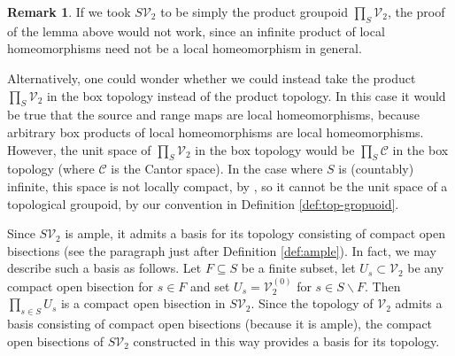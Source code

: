\documentclass[10pt,a4paper]{amsart}
\numberwithin{equation}{section}
\numberwithin{figure}{section}
\theoremstyle{definition}
\newtheorem{rem}[thm]{Remark}
\newcommand{\cC}{\mathcal{C}}
\newcommand{\cV}{\mathcal{V}}
\begin{document}
\begin{rem}
If we took $S\cV_2$ to be simply the product groupoid $\prod_S \cV_2$, the proof of the lemma above would not work, since an infinite product of local homeomorphisms need not be a local homeomorphism in general.

Alternatively, one could wonder whether we could instead take the product $\prod_S \cV_2$ in the box topology instead of the product topology. In this case it would be true that the source and range maps are local homeomorphisms, because arbitrary box products of local homeomorphisms are local homeomorphisms. However, the unit space of $\prod_S \cV_2$ in the box topology would be $\prod_S \cC$ in the box topology (where $\cC$ is the Cantor space). In the case where $S$ is (countably) infinite, this space is not locally compact, by \cite[Theorem 1.3]{Williams1984}, so it cannot be the unit space of a topological groupoid, by our convention in Definition \ref{def:top-gropuoid}.
\end{rem}

Since $S\cV_2$ is ample, it admits a basis for its topology consisting of compact open bisections (see the paragraph just after Definition \ref{def:ample}). In fact, we may describe such a basis as follows. Let $F \subseteq S$ be a finite subset, let $U_s \subset \cV_2$ be any compact open bisection for $s\in F$ and set $U_s = \cV_2^{(0)}$ for $s \in S \smallsetminus F$. Then $\prod_{s \in S} U_s$ is a compact open bisection in $S\mathcal{V}_2$. Since the topology of $\cV_2$ admits a basis consisting of compact open bisections (because it is ample), the compact open bisections of $S\cV_2$ constructed in this way provides a basis for its topology.
\end{document}
